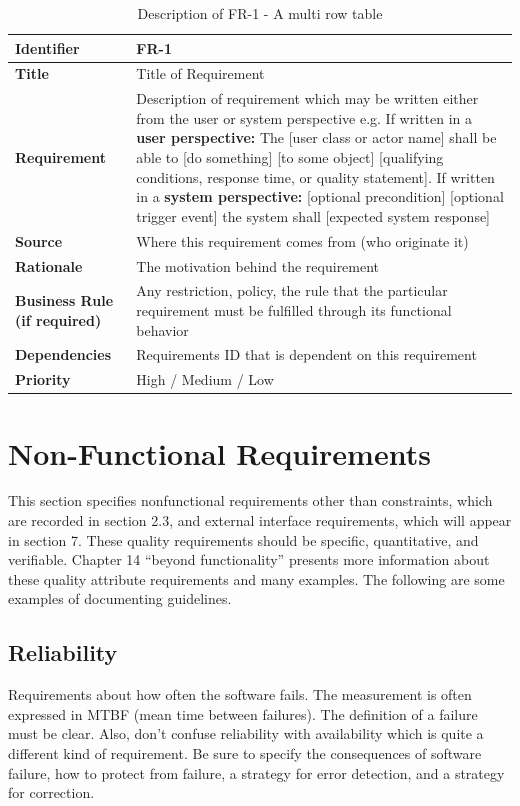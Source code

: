 \documentclass[A4paper,12pt]{report}
\theoremstyle{plain}
\theoremstyle{definition}
\theoremstyle{remark}
\numberwithin{equation}{section}
\begin{document}
\begin{table}[t]
	\centering
	\caption{Description of FR-1 - A multi row table}
	\begin{tabular}[c]{|p{4cm}|p{10cm}|}
		\toprule
		\textbf{Identifier} &\textbf{FR-1}\\
		\midrule
		\textbf{Title} & Title of Requirement \\
		\midrule
		\textbf{Requirement}&Description of requirement which may be written either from the user or system perspective e.g. \linebreak
		If written in a \textbf{user perspective:} The [user class or actor name] shall be able to [do something] [to some object] [qualifying conditions, response time, or quality statement].\linebreak
		If written in a \textbf{system perspective:} [optional precondition] [optional trigger event] the system shall [expected system response] \\
		\midrule
		\textbf{Source} & Where this requirement comes from (who originate it)\\
		\midrule
		\textbf{Rationale} & The motivation behind the requirement \\
		\midrule
		\textbf{Business Rule (if required)} & Any restriction, policy, the rule that the particular requirement must be fulfilled through its functional behavior\\
		\midrule
		\textbf{Dependencies} & Requirements ID that is dependent on this requirement \\
		\midrule
		\textbf{Priority} & High / Medium / Low\\
		\bottomrule
		
		
	\end{tabular}
\end{table}

\section{Non-Functional Requirements}
This section specifies nonfunctional requirements other than constraints, which are recorded in section 2.3, and external interface requirements, which will appear in section 7. These quality requirements should be specific, quantitative, and verifiable. Chapter 14 “beyond functionality” presents more information about these quality attribute requirements and many examples. The following are some examples of documenting guidelines.
\subsection{Reliability} 
Requirements about how often the software fails. The measurement is often expressed in MTBF (mean time between failures). The definition of a failure must be clear. Also, don't confuse reliability with availability which is quite a different kind of requirement.  Be sure to specify the consequences of software failure, how to protect from failure, a strategy for error detection, and a strategy for correction.
\end{document}

